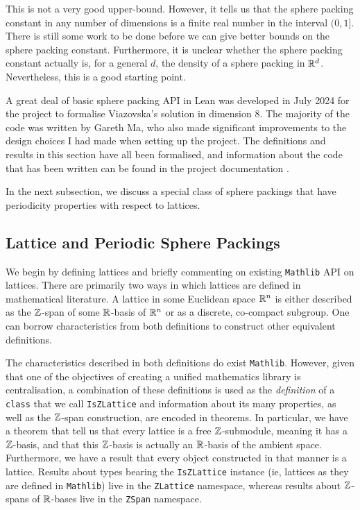 This is not a very good upper-bound. However, it tells us that the sphere packing constant in any number of dimensions is a finite real number in the interval $(0, 1]$. There is still some work to be done before we can give better bounds on the sphere packing constant. Furthermore, it is unclear whether the sphere packing constant actually is, for a general $d$, the density of a sphere packing in $\mathbb{R}^d$. Nevertheless, this is a good starting point.

A great deal of basic sphere packing API in Lean was developed in July 2024 for the project to formalise Viazovska's solution in dimension $8$. The majority of the code was written by Gareth Ma, who also made significant improvements to the design choices I had made when setting up the project. The definitions and results in this section have all been formalised, and information about the code that has been written can be found in the project documentation \cite[\texttt{SpherePacking.Basic.SpherePacking}]{documentation}.

In the next subsection, we discuss a special class of sphere packings that have periodicity properties with respect to lattices.

\subsection{Lattice and Periodic Sphere Packings}

We begin by defining lattices and briefly commenting on existing \verb|Mathlib| API on lattices. There are primarily two ways in which lattices are defined in mathematical literature. A lattice in some Euclidean space $\mathbb{R}^n$ is either described as the $\mathbb{Z}$-span of some $\mathbb{R}$-basis of $\mathbb{R}^n$ or as a discrete, co-compact subgroup. One can borrow characteristics from both definitions to construct other equivalent definitions.

The characteristics described in both definitions do exist \verb|Mathlib|. However, given that one of the objectives of creating a unified mathematics library is centralisation, a combination of these definitions is used as the \textit{definition} of a \verb|class| that we call \verb|IsZLattice| and information about its many properties, as well as the $\mathbb{Z}$-span construction, are encoded in theorems. In particular, we have a theorem that tell us that every lattice is a free $\mathbb{Z}$-submodule, meaning it has a $\mathbb{Z}$-basis, and that this $\mathbb{Z}$-basis is actually an $\mathbb{R}$-basis of the ambient space. Furthermore, we have a result that every object constructed in that manner is a lattice. Results about types bearing the \verb|IsZLattice| instance (ie, lattices as they are defined in \verb|Mathlib|) live in the \verb|ZLattice| namespace, whereas results about $\mathbb{Z}$-spans of $\mathbb{R}$-bases live in the \verb|ZSpan| namespace. 

